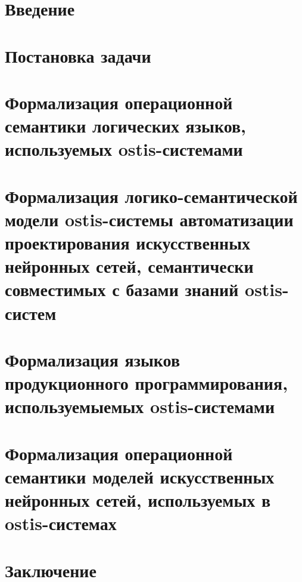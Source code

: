 \section*{Введение}


\newpage
\section{Постановка задачи}



\newpage
\section{Формализация операционной семантики логических языков, используемых ostis-системами}



\newpage
\section{Формализация логико-семантической модели ostis-системы автоматизации проектирования искусственных нейронных сетей, семантически совместимых с базами знаний ostis-систем}


\newpage
\section{Формализация языков продукционного программирования, используемыемых ostis-системами}


\newpage
\section{Формализация операционной семантики моделей искусственных нейронных сетей, используемых в ostis-системах}



\newpage
\section*{Заключение}

